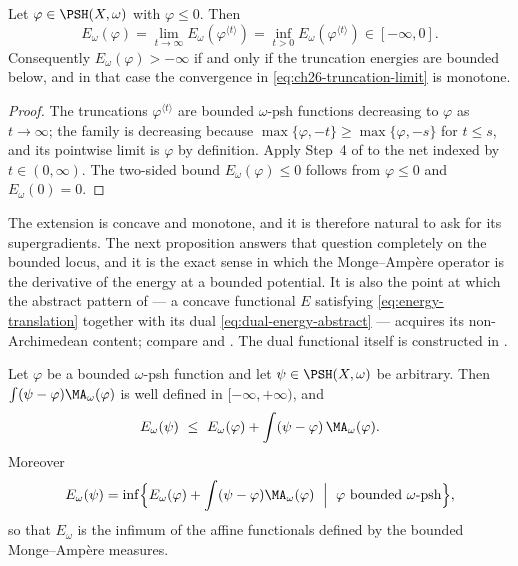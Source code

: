 \begin{proposition}
\label{prop:ch26-truncation-limit}
Let \(\varphi\in\PSH(X,\omega)\) with \(\varphi\leq0\).  Then
\begin{equation}
\label{eq:ch26-truncation-limit}
 E_\omega(\varphi)
 =\lim_{t\to\infty}E_\omega(\varphi^{\langle t\rangle})
 =\inf_{t>0}E_\omega(\varphi^{\langle t\rangle})
 \in[-\infty,0].
\end{equation}
Consequently \(E_\omega(\varphi)>-\infty\) if and only if the truncation
energies are bounded below, and in that case the convergence in
\eqref{eq:ch26-truncation-limit} is monotone.
\end{proposition}

\begin{proof}
The truncations \(\varphi^{\langle t\rangle}\) are bounded \(\omega\)-psh
functions decreasing to \(\varphi\) as \(t\to\infty\); the family is
decreasing because \(\max\{\varphi,-t\}\geq\max\{\varphi,-s\}\) for
\(t\leq s\), and its pointwise limit is \(\varphi\) by definition.  Apply
Step~4 of  to the net indexed by
\(t\in(0,\infty)\).  The two-sided bound \(E_\omega(\varphi)\leq0\) follows
from \(\varphi\leq0\) and \(E_\omega(0)=0\).
\end{proof}

The extension is concave and monotone, and it is therefore natural to ask for
its supergradients.  The next proposition answers that question completely on
the bounded locus, and it is the exact sense in which the Monge--Amp\`ere
operator is the derivative of the energy at a bounded potential.  It is also
the point at which the abstract pattern of  ---
a concave functional \(E\) satisfying \eqref{eq:energy-translation} together
with its dual \eqref{eq:dual-energy-abstract} --- acquires its
non-Archimedean content; compare  and
.  The dual functional itself is constructed
in .

\begin{proposition}
\label{prop:ch26-supergradient}
Let \(\varphi\) be a bounded \(\omega\)-psh function and let
\(\psi\in\PSH(X,\omega)\) be arbitrary.  Then
\(\int(\psi-\varphi)\MA_\omega(\varphi)\) is well defined in
\([-\infty,+\infty)\), and
\begin{equation}
\label{eq:ch26-supergradient}
 E_\omega(\psi)\ \leq\ E_\omega(\varphi)
   +\int(\psi-\varphi)\,\MA_\omega(\varphi).
\end{equation}
Moreover
\begin{equation}
\label{eq:ch26-energy-as-infimum}
 E_\omega(\psi)
 =\inf\Bigl\{E_\omega(\varphi)+\int(\psi-\varphi)\MA_\omega(\varphi)
   \ \Bigm|\ \varphi\ \text{bounded }\omega\text{-psh}\Bigr\},
\end{equation}
so that \(E_\omega\) is the infimum of the affine functionals defined by the
bounded Monge--Amp\`ere measures.
\end{proposition}

